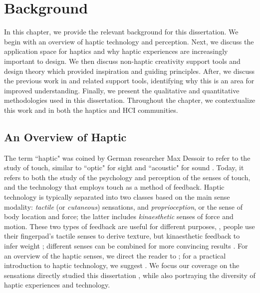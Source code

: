 
\chapter{Background}
\label{ch:rw}

In this chapter, we provide the relevant background for this dissertation.
We begin with an overview of haptic technology and perception.
Next, we discuss the application space for haptics and why haptic experiences are increasingly important to design.
We then discuss non-haptic creativity support tools and design theory which provided inspiration and guiding principles.
After, we discuss the previous work in \haxd and related support tools, identifying why this is an area for improved understanding.
Finally, we present the qualitative and quantitative methodologies used in this dissertation.
Throughout the chapter, we contextualize this work and \haxd in both the haptics and HCI communities.


%
%
\section{An Overview of Haptic}
The term ``haptic" was coined  by German researcher Max Dessoir to refer to the study of touch, similar to ``optic" for sight and ``acoustic" for sound \cite{Grunwald2008}.
Today, it refers to both the study of the psychology and perception of the senses of touch, and the technology that employs touch as a method of feedback.
Haptic technology is typically separated into two classes based on the main sense modality: \emph{tactile} (or \emph{cutaneous}) sensations, and \emph{proprioception}, or the sense of body location and force;  the latter includes \emph{kinaesthetic} senses of force and motion.
These two types of feedback are useful for different purposes, \eg, people use their fingerpad's tactile senses to derive texture, but kinaesthetic feedback to infer weight \cite{Lederman1987};
different senses can be combined for more convincing results \cite{Okamura1998}.
For an overview of the haptic senses, we direct the reader to \citet{Lederman2009survey}; for a practical introduction to haptic technology, we suggest \citet{Hayward2007}.
We focus our coverage on the sensations directly studied  this dissertation , while also portraying the diversity of haptic experiences and technology.

